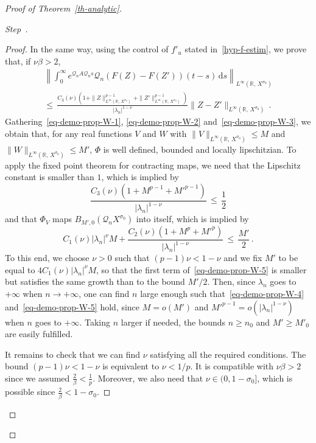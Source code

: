 \documentclass[AHL,Unicode,longabstracts]{cedram}
\newcommand{\RR}{\mathbb{R}}
\newcommand{\Qc}{\mathcal{Q}}
\newcommand{\drm}{\mathrm{d}}
\newcounter{stepcount}
\newenvironment{step}{\refstepcounter{stepcount}\begin{proof}[Step~\thestepcount]}{\let\qed\relax\end{proof}}
\begin{document}
\begin{proof}[{Proof of Theorem~\ref{th-analytic}}]
\begin{step}
\begin{proof}
In the same way, using the control of $f'_u$ stated in~\eqref{hyp-f-estim}, we prove that, if $\nu\beta>2$,
\begin{multline}\label{eq-demo-prop-W-3}
\left\| \int_0^\infty e^{\Qc_n A\Qc_n s}\Qc_n \left(F(Z)-F(Z')\right)(t-s)\,\drm s\right\|_{L^\infty(\RR,\,X^{\sigma_0})}\\
\leq\,\frac{C_3(\nu)\left(1+\|Z\|_{ L^\infty(\RR,\,X^{\sigma_0})}^{p-1}+\|Z'\|_{ L^\infty(\RR,\,X^{\sigma_0})}^{p-1}\right)}{|\lambda_n|^{ 1-\nu}}\|Z-Z'\|_{ L^\infty(\RR,\, X^{\sigma_0})}\,.
\end{multline}
Gathering~\eqref{eq-demo-prop-W-1}, \eqref{eq-demo-prop-W-2} and~\eqref{eq-demo-prop-W-3}, we obtain that, for any real functions $V$ and $W$ with $\|V\|_{ L^\infty(\RR,\,X^{\sigma_0})}\leq M$ and $\|W\|_{ L^\infty(\RR,\,X^{\sigma_0})}\leq M'$, $\Phi$ is well defined, bounded and locally lipschitzian. To apply the fixed point theorem for contracting maps, we need that the Lipschitz constant is smaller than $1$, which is implied by
\begin{equation}\label{eq-demo-prop-W-4}
\frac{C_3(\nu)\left(1+M^{p-1}+{M'}^{p-1}\right)}{ |\lambda_n|^{ 1-\nu}}\,\leq\,\frac 12
\end{equation}
and that $\Phi_V$ maps $B_{M',0}(\Qc_nX^{\sigma_0})$ into itself, which is implied by
\begin{equation}\label{eq-demo-prop-W-5}
C_1(\nu)|\lambda_n|^{\nu} M +
\frac{C_2(\nu)\left(1+M^p+{M'}^p\right) } {|\lambda_n|^{ 1-\nu}}\,\leq\,\frac{M'}2\,.
\end{equation}
To this end, we choose $\nu>0$ such that $(p-1)\nu < 1-\nu$ and we fix $M'$ to be equal to $4C_1(\nu)|\lambda_n|^\nu M$, so that the first term of~\eqref{eq-demo-prop-W-5} is smaller but satisfies the same growth than to the bound $M'/2$. Then, since $\lambda_n$ goes to $+\infty$ when $n\rightarrow +\infty$, one can find $n$ large enough such that~\eqref{eq-demo-prop-W-4} and~\eqref{eq-demo-prop-W-5} hold, since $M=o(M')$ and ${M'}^{p-1}=o(|\lambda_n|^{1-\nu})$ when $n$ goes to $+\infty$. Taking $n$ larger if needed, the bounds $n\geq n_0$ and $M'\geq M'_0$ are easily fulfilled.

It remains to check that we can find $\nu$ satisfying all the required conditions. The bound $(p-1)\nu < 1-\nu$ is equivalent to $\nu<1/p$. It is compatible with $\nu\beta>2$ since we assumed $\frac{2}{\beta}<\frac{1}{p}$. Moreover, we also need that $\nu\in (0,1-\sigma_0]$, which is possible since $\frac{2}{\beta}< 1-\sigma_0$.



\end{proof}
\end{step}
\end{proof}
\end{document}
